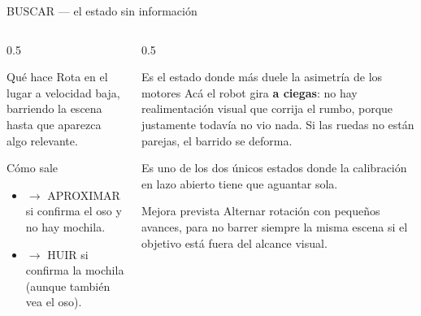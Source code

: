 \documentclass[aspectratio=169,10pt]{beamer}
\newcommand{\hacia}{$\rightarrow$}
\begin{document}
\begin{frame}{BUSCAR --- el estado sin información}
  \begin{columns}[T,onlytextwidth]
    \begin{column}{0.5\textwidth}
      \begin{block}{Qué hace}
        \small Rota en el lugar a velocidad baja, barriendo la escena hasta que
        aparezca algo relevante.
      \end{block}
      \begin{block}{Cómo sale}
        \small
        \begin{itemize}
          \item \hacia{} APROXIMAR si confirma el oso y no hay mochila.
          \item \hacia{} HUIR si confirma la mochila (aunque también vea el oso).
        \end{itemize}
      \end{block}
    \end{column}
    \begin{column}{0.5\textwidth}
      \begin{alertblock}{Es el estado donde más duele la asimetría de los motores}
        \small
        Acá el robot gira \textbf{a ciegas}: no hay realimentación visual que
        corrija el rumbo, porque justamente todavía no vio nada. Si las ruedas no
        están parejas, el barrido se deforma.
        \vspace{0.4em}

        Es uno de los dos únicos estados donde la calibración en lazo abierto
        tiene que aguantar sola.
      \end{alertblock}
      \begin{block}{Mejora prevista}
        \small Alternar rotación con pequeños avances, para no barrer siempre la
        misma escena si el objetivo está fuera del alcance visual.
      \end{block}
    \end{column}
  \end{columns}
\end{frame}
\end{document}
